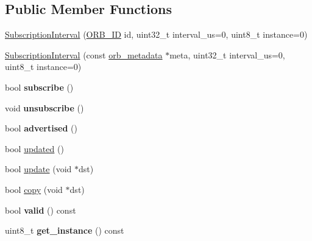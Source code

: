 \subsection*{Public Member Functions}
\begin{DoxyCompactItemize}
\item 
\hyperlink{classuORB_1_1SubscriptionInterval_a7e51c851205bd12c2a973f1dbcaa91a5}{Subscription\+Interval} (\hyperlink{uORB_8h_a96af5434ec1acdf24287bd7851b0413f}{O\+R\+B\+\_\+\+ID} id, uint32\+\_\+t interval\+\_\+us=0, uint8\+\_\+t instance=0)
\item 
\hyperlink{classuORB_1_1SubscriptionInterval_a5484a71c5ad98ca70bfa88d8de9550af}{Subscription\+Interval} (const \hyperlink{structorb__metadata}{orb\+\_\+metadata} $\ast$meta, uint32\+\_\+t interval\+\_\+us=0, uint8\+\_\+t instance=0)
\item 
\mbox{\label{classuORB_1_1SubscriptionInterval_a1febf0b92009d71a8866e759c6fc0e6d}} 
bool {\bfseries subscribe} ()
\item 
\mbox{\label{classuORB_1_1SubscriptionInterval_aa1b4d9eac19750eedc7c809c88a0534c}} 
void {\bfseries unsubscribe} ()
\item 
\mbox{\label{classuORB_1_1SubscriptionInterval_ad37eaf4990b69463eb3f3c53db76874d}} 
bool {\bfseries advertised} ()
\item 
bool \hyperlink{classuORB_1_1SubscriptionInterval_aa1c12b83d65604e306b919a2c224e32e}{updated} ()
\item 
bool \hyperlink{classuORB_1_1SubscriptionInterval_ac9198cc23c666df10af2a8fb3f809508}{update} (void $\ast$dst)
\item 
bool \hyperlink{classuORB_1_1SubscriptionInterval_a25125ed09772665d3b4b4e6978fb3e1c}{copy} (void $\ast$dst)
\item 
\mbox{\label{classuORB_1_1SubscriptionInterval_a82ac3efc49cc896017552f277a6ae003}} 
bool {\bfseries valid} () const
\item 
\mbox{\label{classuORB_1_1SubscriptionInterval_a93e8f0a9b49c1f38b3a68f725fef4ab5}} 
uint8\+\_\+t {\bfseries get\+\_\+instance} () const
\item 
\mbox{\label{classuORB_1_1SubscriptionInterval_a3ef43a25c5bb473b5e8e86a57a1b0387}} 

\end{DoxyCompactItemize}
